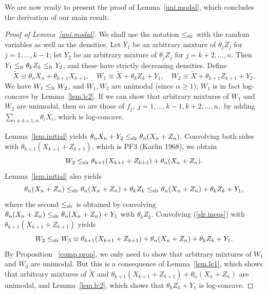 \documentclass[11pt]{article}
\begin{document}
We are now ready to present the proof of Lemma~\ref{uni.modal}, which concludes the derivation of our main result. 
\begin{proof}[Proof of Lemma~\ref{uni.modal}]
We shall use the notation $\leq_{\rm slr}$ with the random variables as well as the densities.  Let $Y_1$ be an arbitrary mixture of $\theta_j Z_j$ for $j=1,\ldots, k-1$; let $Y_2$ be an arbitrary mixture of $\theta_j Z_j$ for $j=k+2, \ldots, n$.  Then $Y_1\leq_{\rm lr} \theta_k Z_k\leq_{\rm lr} Y_2$, and these have strictly decreasing densities.  Define 
$$\tilde{X}\equiv \theta_n X_n + \theta_{k+1} X_{k+1},\quad W_1 \equiv \tilde{X} + \theta_k Z_k + Y_1,\quad W_2 \equiv \tilde{X} +\theta_{k+1} Z_{k+1} + Y_2.$$  
We have $W_1\leq_{\rm lr} W_2$, and $W_1, W_2$ are unimodal (since $\alpha\geq 1$); $W_1$ is in fact log-concave by Lemma~\ref{lem.lc2}.  If we can show that arbitrary mixtures of $W_1$ and $W_2$ are unimodal, then so are those of $f_j,\ j=1,\ldots, k-1, k+2,\ldots, n,$ by adding $\sum_{i\neq k+1, n} \theta_i X_i$, which is log-concave.  

Lemma~\ref{lem.initial} yields $\theta_n X_n + Y_2 \leq_{\rm slr} \theta_n (X_n + Z_n)$. Convolving both sides with $\theta_{k+1} (X_{k+1} + Z_{k+1})$, which is PF3 (Karlin 1968), we obtain 
$$W_2\leq_{\rm slr} \theta_{k+1}(X_{k+1}+Z_{k+1})+\theta_n (X_n +Z_n).$$
Lemma~\ref{lem.initial} also yields
\begin{equation}
\label{slr.ineqs}
\theta_n(X_n+Z_n) \leq_{\rm slr} \theta_n(X_n+Z_n) + \theta_k Z_k  \leq_{\rm slr} 
 \theta_n(X_n+Z_n) + \theta_k Z_k + Y_1,
 \end{equation}
where the second $\leq_{\rm slr}$ is obtained by convolving $\theta_n(X_n+Z_n) \leq_{\rm slr} \theta_n(X_n+Z_n) + Y_1$ with $\theta_k Z_k$.  Convolving (\ref{slr.ineqs}) with $\theta_{k+1}(X_{k+1}+Z_{k+1})$ yields
$$W_2\leq_{\rm slr}  W_3\equiv \theta_{k+1}(X_{k+1}+Z_{k+1})+\theta_n (X_n +Z_n) + \theta_k Z_k + Y_1.$$
By Proposition ~\ref{comp.prop}, we only need to show that arbitrary mixtures of $W_1$ and $W_3$ are unimodal.  But this is a consequence of Lemma~\ref{lem.lc1}, which shows that arbitrary mixtures of $\tilde{X}$ and $ \theta_{k+1} (X_{k+1}+Z_{k+1}) + \theta_n (X_n + Z_n)$ are unimodal, and Lemma~\ref{lem.lc2}, which shows that $\theta_k Z_k + Y_1$ is log-concave. 


\end{proof}
\end{document}
